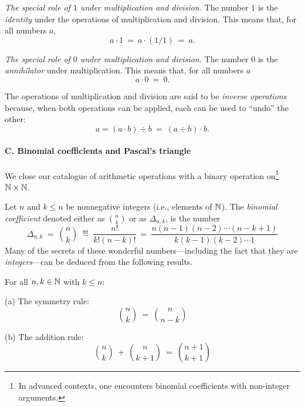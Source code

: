 {\em The special role of $1$ under multiplication and division.}
%
The number $1$ is the {\it identity} under the operations of
multiplication and division.
%
This means that, for all numbers $a$,
\[ a \cdot 1 \ = \ a \cdot (1/1) \ = \ a. \]

{\em The special role of $0$ under multiplication and division.}
%
The number $0$ is the {\it annihilator} under
multiplication. This means that, for
all numbers $a$
\[ a \cdot 0 \ = \ 0. \]

The operations of multiplication and division are said to be {\em
  inverse operations}  because, when both operations can be applied, each
can be used to ``undo'' the other:
\[ a = (a \cdot b) \div b \ = \ (a \div b) \cdot b.  \]

\medskip

\paragraph{\small\sf C. Binomial coefficients and Pascal's triangle}

We close our catalogue of arithmetic operations with a binary
operation on\footnote{In advanced contexts, one encounters binomial
  coefficients with non-integer arguments.}~$\mathbb{N} \times \mathbb{N}$.

Let $n$ and $k \leq n$ be nonnegative integers (i.e., elements of
$\mathbb{N}$).  The {\it binomial coefficient} denoted either as
$\displaystyle {n \choose k}$ or as $\Delta_{n,k}$, is the number
\begin{equation}
\label{eq:binom-coeff}
\Delta_{n,k} \ = \
{n \choose k} \ \eqdef \ \frac{n!}{k!(n-k)!} \ = \
\frac{n(n-1)(n-2) \cdots (n-k+1)}{k (k-1)(k-2) \cdots 1}
\end{equation}
Many of the secrets of these wonderful numbers---including the fact
that they are {\em integers}---can be deduced from the following
results.

\begin{prop}
\label{thm:manipulate-binom-coeff}
For all $n, k \in \mathbb{N}$ with $k \leq n$:

{\rm (a)} The symmetry rule:
\begin{equation}
\label{eq:symmetry-binom-coeff}
{n \choose k} \ = \ {n \choose {n-k}}
\end{equation}

{\rm (b)} The addition rule:
\begin{equation}
\label{eq:add-binom-coeff}
{n \choose k} \ + \ {n \choose {k+1}} \ = \ {{n+1} \choose {k+1}}
\end{equation}
\end{prop}

